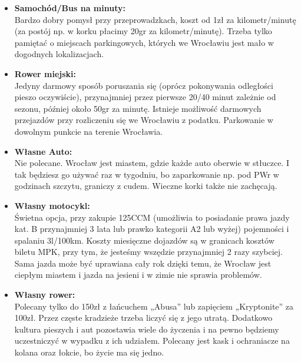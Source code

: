 \documentclass[11pt]{article}
\begin{document}
\begin{itemize}
    \item \textbf{Samochód/Bus na minuty:} \\
    \indent Bardzo dobry pomysł przy przeprowadzkach, koszt od 1zł za kilometr/minutę (za postój np. w korku płacimy 20gr za kilometr/minutę). Trzeba tylko pamiętać o miejscach parkingowych, których we Wrocławiu jest mało w dogodnych lokalizacjach.
    \item \textbf{Rower miejski:} \\
    \indent Jedyny darmowy sposób poruszania się (oprócz pokonywania odległości pieszo oczywiście), przynajmniej przez pierwsze 20/40 minut zależnie od sezonu, później około 50gr za minutę. Istnieje możliwość darmowych przejazdów przy rozliczeniu się we Wrocławiu z podatku. Parkowanie w dowolnym punkcie na terenie Wrocławia.
    \newpage
    \item \textbf{Własne Auto:} \\
    \indent Nie polecane. Wrocław jest miastem, gdzie każde auto oberwie w stłuczce. I tak będziesz go używać raz w tygodniu, bo zaparkowanie np. pod PWr w godzinach szczytu, graniczy z cudem. Wieczne korki także nie zachęcają.
    \item \textbf{Własny motocykl:} \\
    \indent Świetna opcja, przy zakupie 125CCM (umożliwia to posiadanie prawa jazdy kat. B przynajmniej 3 lata lub prawko kategorii A2 lub wyżej) pojemności i spalaniu 3l/100km. Koszty miesięczne dojazdów są w granicach kosztów biletu MPK, przy tym, że jesteśmy wszędzie przynajmniej 2 razy szybciej. Sama jazda może być uprawiana cały rok dzięki temu, że Wrocław jest ciepłym miastem i jazda na jesieni i w zimie nie sprawia problemów.
    \item \textbf{Własny rower:} \\
    \indent Polecany tylko do 150zł z łańcuchem „Abusa” lub zapięciem „Kryptonite” za 100zł. Przez częste kradzieże trzeba liczyć się z jego utratą. Dodatkowo kultura pieszych i aut pozostawia wiele do życzenia i na pewno będziemy uczestniczyć w wypadku z ich udziałem. Polecany jest kask i ochraniacze na kolana oraz łokcie, bo życie ma się jedno.
\end{itemize}
\newpage
\end{document}
